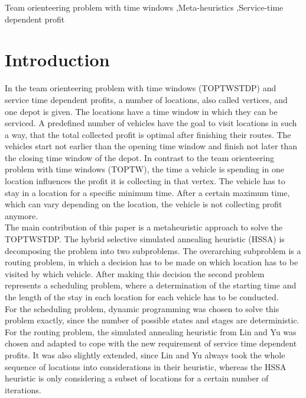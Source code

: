 \documentclass[final,5p,times,twocolumn]{elsarticle}
\begin{document}
\begin{frontmatter}
\begin{keyword}
Team orienteering problem with time windows \sep Meta-heuristics \sep Service-time dependent profit


\end{keyword}

\end{frontmatter}


\section{Introduction}
In the team orienteering problem with time windows (TOPTWSTDP) and service time dependent profits, a number of locations, also called vertices, and one depot is given. The locations have a time window in which they can be serviced. A predefined number of vehicles have the goal to visit locations in such a way, that the total collected profit is optimal after finishing their routes. The vehicles start not earlier than the opening time window and finish not later than the closing time window of the depot. In contrast to the team orienteering problem with time windows (TOPTW)\cite{Vansteenwegen:2008pet}, the time a vehicle is spending in one location influences the profit it is collecting in that vertex. The vehicle has to stay in a location for a specific minimum time. After a certain maximum time, which can vary depending on the location, the vehicle is not collecting profit anymore. \\
The main contribution of this paper is a metaheuristic approach to solve the TOPTWSTDP. The hybrid selective simulated annealing heuristic (HSSA) is decomposing the problem into two subproblems. The overarching subproblem is a routing problem, in which a decision has to be made on which location has to be visited by which vehicle. After making this decision the second problem represents a scheduling problem, where a determination of the starting time and the length of the stay in each location for each vehicle has to be conducted.\\ 
For the scheduling problem, dynamic programming was chosen to solve this problem exactly, since the number of possible states and stages are deterministic.\\
For the routing problem, the simulated annealing heuristic from Lin and Yu \cite{Lin:2012sa} was chosen and adapted to cope with the new requirement of service time dependent profits. It was also slightly extended, since Lin and Yu \cite{Lin:2012sa} always took the whole sequence of locations into considerations in their heuristic, whereas the HSSA heuristic is only considering a subset of locations for a certain number of iterations. \\
\end{document}
